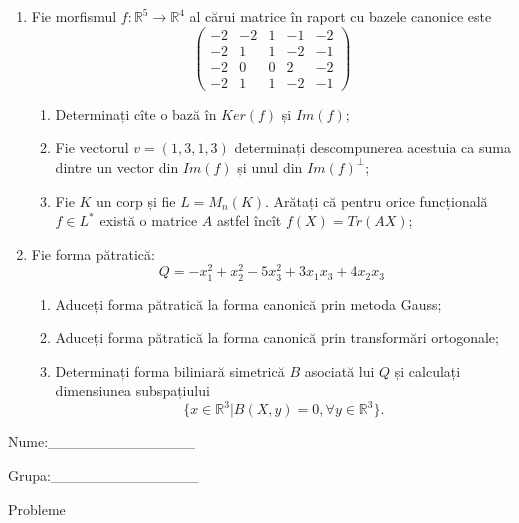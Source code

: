 \documentclass{article}
\begin{document}
\begin{enumerate}
 \item Fie morfismul $f:\mathbb{R}^5 \to \mathbb{R}^4$ al cărui matrice în raport cu bazele canonice este
$$\begin{pmatrix}
-2&-2&1&-1&-2\\
-2&1&1&-2&-1\\
-2&0&0&2&-2\\
-2&1&1&-2&-1
\end{pmatrix}$$

\begin{enumerate}
\item Determinați cîte o bază în $Ker(f)$ și $Im(f)$;
\item Fie vectorul $v=(1,3,1,3)$ determinați descompunerea acestuia ca suma dintre un vector din $Im(f)$ și unul din $Im(f)^\perp$;
\item Fie $K$ un corp și fie $L=M_n(K)$. Arătați că pentru orice funcțională $f \in L^*$ există o matrice $A$ astfel încît $f(X)=Tr(AX)$;
\end{enumerate}
\item Fie forma pătratică:
$$Q= -x_1^2+x_2^2-5x_3^2+3x_1x_3+4x_2x_3$$

\begin{enumerate}
\item Aduceți forma pătratică la forma canonică prin metoda Gauss;
\item Aduceți forma pătratică la forma canonică prin transformări ortogonale;
\item Determinați forma biliniară simetrică $B$ asociată lui $Q$ și calculați dimensiunea subspațiului
$$\{x \in \mathbb{R}^3 | B(X,y)=0,\forall y \in \mathbb{R}^3\}.$$

\end{enumerate}
\end{enumerate}
\newpage
\begin{flushright}
Nume:\_\_\_\_\_\_\_\_\_\_\_\_\_\_
 
 
Grupa:\_\_\_\_\_\_\_\_\_\_\_\_\_\_
\end{flushright}
\begin{center}
\vspace{2cm}
{\Large Probleme}
\vspace{2cm}
\end{center}
\end{document}
